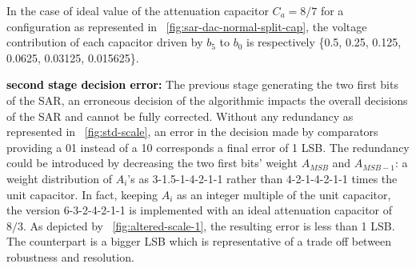 In the case of ideal value of the attenuation capacitor $C_a = 8/7$ for a configuration as represented in \figurename~\ref{fig:sar-dac-normal-split-cap}, the voltage contribution of each capacitor driven by $b_5$ to $b_0$ is respectively \{0.5, 0.25, 0.125, 0.0625, 0.03125, 0.015625\}.

\textbf{\textcolor{black}{second stage decision error:}}
The previous stage generating the two first bits of the SAR, an erroneous decision of the algorithmic impacts the overall decisions of the SAR and cannot be fully corrected. Without any redundancy as represented in \figurename~\ref{fig:std-scale}, an error in the decision made by comparators providing a 01 instead of a 10 corresponds a final error of 1 LSB\@. The redundancy could be introduced by decreasing the two first bits’ weight \(A_{MSB}\) and \(A_{MSB-1}\): a weight distribution of \(A_i\)'s as 3-1.5-1-4-2-1-1 rather than 4-2-1-4-2-1-1 times the unit capacitor. In fact, keeping \(A_i\) as an integer multiple of the unit capacitor, the version 6-3-2-4-2-1-1 is implemented with an ideal attenuation capacitor of \(8/3\). As depicted by \figurename~\ref{fig:altered-scale-1}, the resulting error is less than 1 LSB\@. The counterpart is a bigger LSB which is representative of a trade off between robustness and resolution. 

